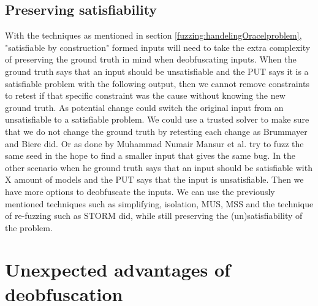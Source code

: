 \subsection{Preserving satisfiability}
\label{inputReduction:preservingSat}
With the techniques as mentioned in section \ref{fuzzing:handelingOracelproblem}, "satisfiable by construction" formed inputs will need to take the extra complexity of preserving the ground truth in mind when deobfuscating inputs. When the ground truth says that an input should be unsatisfiable and the PUT says it is a satisfiable problem with the following output, then we cannot remove constraints to retest if that specific constraint was the cause without knowing the new ground truth. As potential change could switch the original input from an unsatisfiable to a satisfiable problem. We could use a trusted solver to make sure that we do not change the ground truth by retesting each change as Brummayer and Biere \cite{2FuzzingAndDeltaDebuggingSMTSolvers} did.
Or as done by  Muhammad Numair Mansur et al. \cite{1mansur2020detecting} try to fuzz the same seed in the hope to find a smaller input that gives the same bug. 
In the other scenario when he ground truth says that an input should be satisfiable with X amount of models and the PUT says that the input is unsatisfiable. Then we have more options to deobfuscate the inputs. We can use the previously mentioned techniques such as simplifying, isolation, MUS, MSS and the technique of re-fuzzing such as STORM did, while still preserving the (un)satisfiability of the problem.

\section{Unexpected advantages of deobfuscation}
